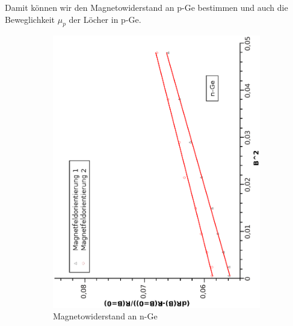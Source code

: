 \documentclass[12pt,a4paper,twopage]{article}
\begin{document}
Damit können wir den Magnetowiderstand an p-Ge bestimmen und auch die Beweglichkeit $\mu_p$ der Löcher in p-Ge.
\begin{figure}
\begin{subfigure}{0.4\textwidth}
\includegraphics[width=0.9\linewidth, angle=-90]{magneton.eps}
\caption{Magnetowiderstand an n-Ge}
\end{subfigure}
\begin{subfigure}{0.4\textwidth}

\end{subfigure}
\end{figure}
\end{document}
